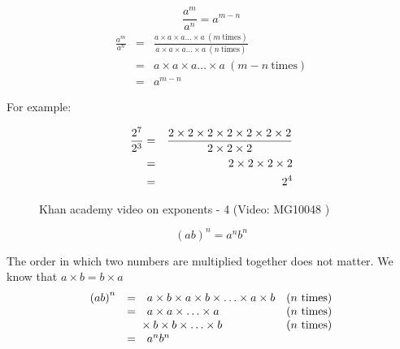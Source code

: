 {
$$ \frac{ {a}^{m} }{ {a}^{n} }={a}^{m-n}$$
\begin{eqnarray*}
\frac{a^m}{a^n} &=& \frac{a \times a \times a \ldots \times a ~ (m~\mbox{times})} {a \times a \times a \ldots \times a ~ (n~\mbox{times})} \\
&= & a \times a \times a \ldots \times a ~ (m-n~\mbox{times}) \\
&= & a^{m-n}
\end{eqnarray*}

}
For example:

\begin{eqnarray*}
    \dfrac{{2}^{7}}{{2}^{3}}& =& \dfrac{2  \times 2  \times 2  \times 2  \times 2  \times 2  \times 2}{2  \times 2  \times 2}\hfill \\
						     & =& 2  \times 2  \times 2  \times 2\hfill \\
						     & =& {2}^{4}\hfill \hfill 
\end{eqnarray*}

\setcounter{subfigure}{0}
\begin{figure}[H] %
\textnormal{Khan academy video on exponents - 4}\vspace{.1in} \nopagebreak
\label{m38359*yt-media6}\label{m38359*yt-video6}
 { (Video:  MG10048 )}
\end{figure}       


{
 $$ {(ab)}^{n}={a}^{n}{b}^{n}$$

\par
The order in which two numbers are multiplied together does not matter. We know that $a \times b = b \times a$ 
\begin{equation*}
\begin{array}{cclc}\hfill {(ab)}^{n}& =& a  \times b  \times a  \times b  \times \ldots  \times a  \times b\hfill & (\mbox{$n$ times})\hfill \\
	\hfill & =& a  \times a  \times \ldots  \times a\hfill & (\mbox{$n$ times})\hfill \\
	\hfill & & \phantom{\rule{-0.166667em}{0ex}}\phantom{\rule{-0.166667em}{0ex}}\phantom{\rule{-0.166667em}{0ex}}\phantom{\rule{-0.166667em}{0ex}}  \times b  \times b  \times \ldots  \times b\hfill & (\mbox{$n$ times})\hfill \\
	\hfill & =& {a}^{n}{b}^{n}\hfill & 
\end{array}
\end{equation*}
}

